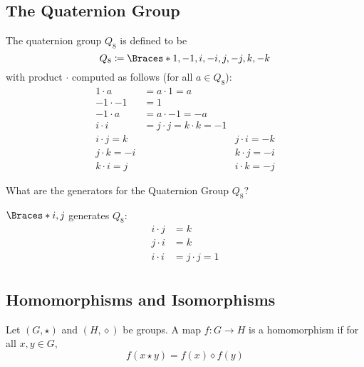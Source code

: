 \documentclass[a5paper]{article}
\begin{document}
\subsection{The Quaternion Group}
\begin{definition}
	The quaternion group $Q_8$ is defined to be
  \begin{equation*}
    Q_8\coloneqq \braces{1,-1,i,-i,j,-j,k,-k}
  \end{equation*}
  with product $\cdot$ computed as follows (for all $a\in Q_8$):
  \begin{align*}
    1\cdot a &= a \cdot 1 = a \\
    -1\cdot -1 &= 1 \\
    -1\cdot a &= a\cdot -1=-a \\
    i\cdot i &= j\cdot j=k\cdot k = -1 \\
    i\cdot j = k &&
    j\cdot i = -k \\
    j\cdot k = -i &&
    k\cdot j = -i \\
    k\cdot i = j &&
    i\cdot k = -j 
  \end{align*}
\end{definition}

\begin{note}
  \begin{field}
    What are the generators for the Quaternion Group $Q_8$?
  \end{field}

  \begin{field}
    $\braces{i,j}$ generates $Q_8$:
    \begin{align*}
      i\cdot j &= k \\
      j\cdot i &= k \\
      i\cdot i &= j\cdot j=1 \\
    \end{align*}
  \end{field}
\end{note}

\subsection{Homomorphisms and Isomorphisms}
\begin{definition}
  Let $(G,\star)$ and $(H, \diamond)$ be groups. A map $f:G\to H$ is a
  homomorphism if for all $x,y\in G$,
  \begin{equation*}
     f(x\star y)= f(x)\diamond f(y)
  \end{equation*}
\end{definition}
\end{document}
